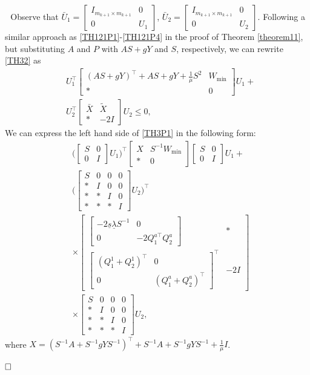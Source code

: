 \documentclass[journal,twoside,web]{ieeecolor}
\renewenvironment{proof}{\vspace{.1cm}\noindent{\sc Proof.}\hspace{0.10cm}\,\,}{$\hfill\Box$\vspace{.1cm}}
\newcommand{\bbm}[1]{\left[\begin{matrix} #1 \end{matrix}\right]}
\begin{document}
\begin{proof}
Observe that $\bar{U}_1=\bbm{I_{m_{k+1}\times m_{k+1}}&0\\0&U_1}$, $\bar{U}_2=\bbm{I_{m_{k+1}\times m_{k+1}}&0\\0&U_2}$. Following a similar approach as \eqref{TH121P1}-\eqref{TH121P4} in the proof of Theorem \ref{theorem11}, but substituting $A$ and $P$ with $AS + gY$ and $S$, respectively, we can rewrite \eqref{TH32} as
\begin{equation}\label{TH3P1}
\begin{aligned}
&U_1^\top
\bbm{
(AS+gY)^\top + AS + gY+\frac{1}{\mu}S^2 & W_{\min} \\
\ast & 0
}
U_1 + \\
&U_2^\top
\bbm{
\bar{X} &\tilde{X} \\
\ast & -2I
}
U_2 \leq 0, 
\end{aligned}
\end{equation}
We can express the left hand side of \eqref{TH3P1} in the following form:
\begin{equation}\label{TH3P40}
\begin{aligned}
&\Big(\bbm{
S&0\\0&I
}U_1\Big)^\top
\bbm{
X & S^{-1}W_{\min} \\
\ast & 0
}
\bbm{
S&0\\0&I
}U_1 + \\
&\Big(\bbm{
S&0&0&0\\\ast&I&0&0\\\ast&\ast&I&0\\\ast&\ast&\ast&I
}U_2\Big)^\top\\&\times
\bbm{\bbm{-2\underline{s}\underline{\lambda}S^{-1}&0\\0&-2Q^{a\top}_1 Q^a_2}
 &*\\
\bbm{(Q^1_1+Q^1_2)^\top&0\\0&(Q^a_1+Q^a_2)^\top}^\top  & -2I
}
\\&\times\bbm{
S&0&0&0\\\ast&I&0&0\\\ast&\ast&I&0\\\ast&\ast&\ast&I
}U_2, 
\end{aligned}
\end{equation}
where $X=(S^{-1}A + S^{-1}gYS^{-1})^\top + S^{-1}A + S^{-1}gYS^{-1}+\frac{1}{\mu}I$.


\end{proof}
\end{document}
